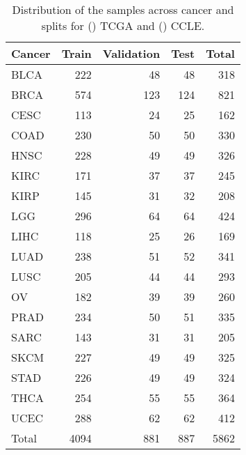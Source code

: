  \begin{table}[htbp]
     \centering
     \caption{Distribution of the samples across cancer and splits for () TCGA and () CCLE.}
     \begin{subtable}[t]{0.45\textwidth}
         \subcaption{}
         \begin{tabular}{lrrrr}
             \toprule
             Cancer & Train & Validation & Test & Total \\
             \midrule
             BLCA   & 222   & 48         & 48   & 318   \\
             BRCA   & 574   & 123        & 124  & 821   \\
             CESC   & 113   & 24         & 25   & 162   \\
             COAD   & 230   & 50         & 50   & 330   \\
             HNSC   & 228   & 49         & 49   & 326   \\
             KIRC   & 171   & 37         & 37   & 245   \\
             KIRP   & 145   & 31         & 32   & 208   \\
             LGG    & 296   & 64         & 64   & 424   \\
             LIHC   & 118   & 25         & 26   & 169   \\
             LUAD   & 238   & 51         & 52   & 341   \\
             LUSC   & 205   & 44         & 44   & 293   \\
             OV     & 182   & 39         & 39   & 260   \\
             PRAD   & 234   & 50         & 51   & 335   \\
             SARC   & 143   & 31         & 31   & 205   \\
             SKCM   & 227   & 49         & 49   & 325   \\
             STAD   & 226   & 49         & 49   & 324   \\
             THCA   & 254   & 55         & 55   & 364   \\
             UCEC   & 288   & 62         & 62   & 412   \\
             \midrule
             Total  & 4094  & 881        & 887  & 5862  \\
             \bottomrule
         \end{tabular}
         \label{tab:tcga}
     \end{subtable}

\end{table}
